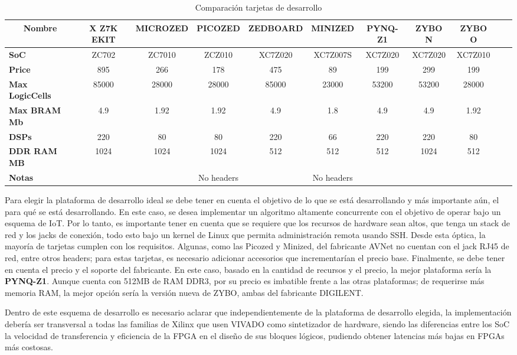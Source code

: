 \begin{table}[!ht]
\small
\centering
\begin{adjustbox}{width=1.1\textwidth}
\small
\begin{tabular}{|l|c|c|c|c|c|c|c|c|c|c|}
\hline
\multicolumn{1}{|c|}{\textbf{Nombre}} & \textbf{X Z7K EKIT} & \textbf{MICROZED} & \textbf{PICOZED} & \textbf{ZEDBOARD} & \textbf{MINIZED} & \textbf{PYNQ-Z1} & \textbf{ZYBO N} & \textbf{ZYBO O} \\ \hline
\textbf{SoC} & ZC702 & ZC7010 & ZCZ010 & XC7Z020 & XC7Z007S & XC7Z020 & XC7Z020 & XC7Z010 \\ \hline
\textbf{Price} & 895 & 266 & 178 & 475 & 89 & 199 & 299 & 199 \\ \hline
\textbf{Max LogicCells} & 85000 & 28000 & 28000 & 85000 & 23000 & 53200 & 53200 & 28000 \\ \hline
\textbf{Max BRAM Mb} & 4.9 & 1.92 & 1.92 & 4.9 & 1.8 & 4.9 & 4.9 & 1.92 \\ \hline
\textbf{DSPs} & 220 & 80 & 80 & 220 & 66 & 220 & 220 & 80 \\ \hline
\textbf{DDR RAM MB} & 1024 & 1024 & 1024 & 512 & 512 & 512 & 1024 & 512 \\ \hline
\textbf{Notas} &  &  & No headers &  & No headers &  &  &  \\ \hline
\end{tabular}%
\end{adjustbox}
\caption{Comparación tarjetas de desarrollo}
\label{fpgaComparison}
\end{table}

Para elegir la plataforma de desarrollo ideal se debe tener en cuenta el objetivo de lo que se está desarrollando y más importante aún, el para qué se está desarrollando. En este caso, se desea implementar un algoritmo altamente concurrente con el objetivo de operar bajo un esquema de IoT. Por lo tanto, es importante tener en cuenta que se requiere que los recursos de hardware sean altos, que tenga un stack de red y los jacks de conexión, todo esto bajo un kernel de Linux que permita administración remota usando SSH. Desde esta óptica, la mayoría de tarjetas cumplen con los requisitos. Algunas, como las Picozed y Minized, del fabricante AVNet no cuentan con el jack RJ45 de red, entre otros headers; para estas tarjetas, es necesario adicionar accesorios que incrementarían el precio base. Finalmente, se debe tener en cuenta el precio y el soporte del fabricante. En este caso, basado en la cantidad de recursos y el precio, la mejor plataforma sería la \textbf{PYNQ-Z1}. Aunque cuenta con 512MB de RAM DDR3, por su precio es imbatible frente a las otras plataformas; de requerirse más memoria RAM, la mejor opción sería la versión nueva de ZYBO, ambas del fabricante DIGILENT.

Dentro de este esquema de desarrollo es necesario aclarar que independientemente de la plataforma de desarrollo elegida, la implementación debería ser transversal a todas las familias de Xilinx que usen VIVADO como sintetizador de hardware, siendo las diferencias entre los SoC la velocidad de transferencia y eficiencia de la FPGA en el diseño de sus bloques lógicos, pudiendo obtener latencias más bajas en FPGAs más costosas.
